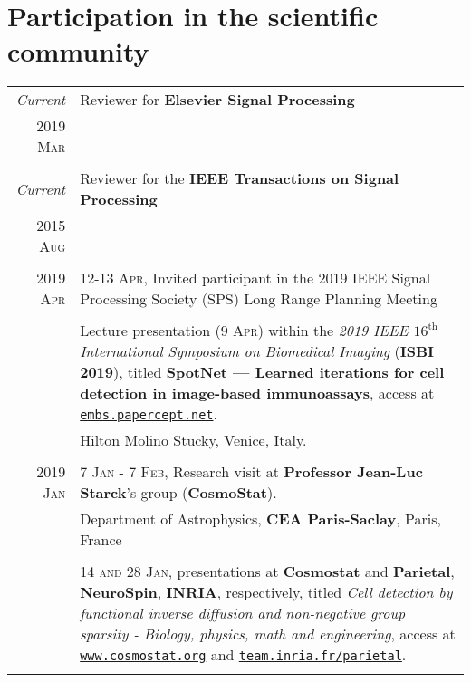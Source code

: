 \documentclass[a4paper,10pt]{article}
\begin{document}

\section{Participation in the scientific community}

\begin{longtable}[H]{r|p{13.5cm}}

  \emph{Current}	& Reviewer for \textbf{Elsevier Signal Processing} \\
  \textsc{2019 Mar} &  \\
   \\

  \emph{Current}	& Reviewer for the \textbf{IEEE Transactions on Signal Processing} \\
  \textsc{2015 Aug} &  \\
   \\


  \textsc{2019 Apr} &  \textsc{12-13 Apr}, Invited participant in the 2019 IEEE Signal Processing Society (SPS) Long Range Planning Meeting\\
                  & \\
                  & Lecture presentation (\textsc{9 Apr}) within the \emph{2019 IEEE $16^{\mathrm{th}}$ International
                    Symposium on Biomedical Imaging} (\textbf{ISBI 2019}), titled
                    \textbf{SpotNet --- Learned iterations for cell detection in image-based immunoassays}, access at \href{https://embs.papercept.net/conferences/scripts/myprogram.pl?ConfID=79&Add=208}{\texttt{embs.papercept.net}}.\\
                  & \footnotesize{Hilton Molino Stucky, Venice, Italy.} \\
   \\



  \textsc{2019 Jan} & \textsc{7 Jan - 7 Feb}, Research visit at \textbf{Professor Jean-Luc Starck}'s group (\textbf{CosmoStat}). \\
                  & \footnotesize{Department of Astrophysics, \textbf{CEA Paris-Saclay}, Paris, France} \\
                  & \\
                  & \textsc{14 and 28 Jan}, presentations at \textbf{Cosmostat} and \textbf{Parietal}, \textbf{NeuroSpin}, \textbf{INRIA}, respectively, titled \emph{Cell detection by functional inverse diffusion and non-negative group sparsity - Biology, physics, math and engineering}, access at \href{http://www.cosmostat.org/events/cosmoclub/cosmosclub-pol}{\texttt{www.cosmostat.org}} and \href{https://team.inria.fr/parietal/slides-of-pol-del-aguila-plas-talk-available-now-online/}{\texttt{team.inria.fr/parietal}}. \\
   \\


\end{longtable}
\end{document}
